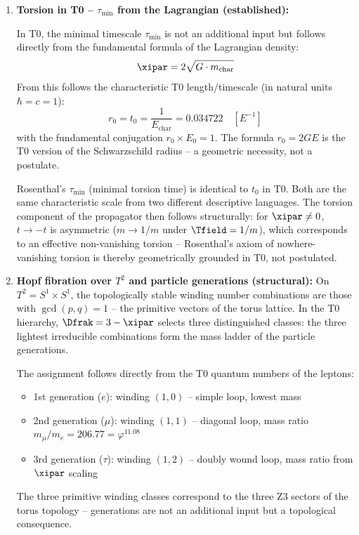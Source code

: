 \begin{enumerate}

  \item \textbf{Torsion in T0 -- $\tau_{\min}$ from the Lagrangian (established):}

  In T0, the minimal timescale $\tau_{\min}$ is not an additional input but follows directly from the fundamental formula of the Lagrangian density:
  \begin{equation}
    \xipar = 2\sqrt{G \cdot m_{\text{char}}}
  \end{equation}
  From this follows the characteristic T0 length/timescale (in natural units $\hbar = c = 1$):
  \begin{equation}
    r_0 = t_0 = \frac{1}{E_{\text{char}}} = 0.034722 \quad [E^{-1}]
  \end{equation}
  with the fundamental conjugation $r_0 \times E_0 = 1$. The formula $r_0 = 2GE$ is the T0 version of the Schwarzschild radius -- a geometric necessity, not a postulate.

  Rosenthal's $\tau_{\min}$ (minimal torsion time) is identical to $t_0$ in T0. Both are the same characteristic scale from two different descriptive languages. The torsion component of the propagator then follows structurally: for $\xipar \neq 0$, $t \to -t$ is asymmetric ($m \to 1/m$ under $\Tfield = 1/m$), which corresponds to an effective non-vanishing torsion -- Rosenthal's axiom of nowhere-vanishing torsion is thereby geometrically grounded in T0, not postulated.

  \item \textbf{Hopf fibration over $T^2$ and particle generations (structural):}
  On $T^2 = S^1 \times S^1$, the topologically stable winding number combinations are those with $\gcd(p,q) = 1$ -- the primitive vectors of the torus lattice. In the T0 hierarchy, $\Dfrak = 3 - \xipar$ selects three distinguished classes: the three lightest irreducible combinations form the mass ladder of the particle generations.

  The assignment follows directly from the T0 quantum numbers of the leptons:
  \begin{itemize}[noitemsep]
    \item 1st generation ($e$): winding $(1,0)$ -- simple loop, lowest mass
    \item 2nd generation ($\mu$): winding $(1,1)$ -- diagonal loop, mass ratio $m_\mu/m_e = 206.77 = \varphi^{11.08}$
    \item 3rd generation ($\tau$): winding $(1,2)$ -- doubly wound loop, mass ratio from $\xipar$ scaling
  \end{itemize}
  The three primitive winding classes correspond to the three Z3 sectors of the torus topology -- generations are not an additional input but a topological consequence.


\end{enumerate}
